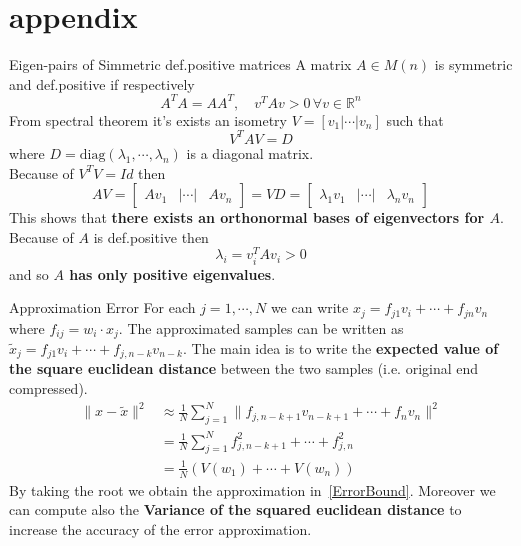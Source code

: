 \documentclass[10pt]{beamer}
\theoremstyle{definition}
\newcommand{\R}{\mathbb{R}}
\newcommand{\1}{\mathbbm{1}}
\begin{document}
\section{appendix}
\begin{frame}{Eigen-pairs of Simmetric def.positive matrices}
  A matrix $A\in M(n)$ is symmetric and def.positive if respectively 
  \begin{equation}
    A^TA=AA^T,\quad v^TAv > 0\,\forall v\in\R^n
  \end{equation}
  From spectral theorem it's exists an isometry $V=[v_1|\cdots|v_n]$ such
  that 
  \[
    V^TAV = D
  \]
  where $D=\mbox{diag}(\lambda_1,\cdots,\lambda_n)$ is a diagonal matrix.\\
  Because of $V^TV=Id$ then 
  \begin{equation}
    AV =
    \begin{bmatrix}
      Av_1&|\cdots|&Av_n
    \end{bmatrix}= VD =
    \begin{bmatrix}
      \lambda_1v_1&|\cdots|&\lambda_nv_n
    \end{bmatrix}
  \end{equation}
  This shows that {\bf there exists an orthonormal bases of eigenvectors for
  $A$}.
  Because of $A$ is def.positive then 
  \[
    \lambda_i = v_i^TAv_i >  0
  \]
  and so {\bf $A$ has only positive eigenvalues}.
\end{frame}
\begin{frame}{Approximation Error}
  For each $j=1,\cdots,N$ we can write $x_j = f_{j1}v_i+\cdots+f_{jn}v_n$
  where $f_{ij} = w_i\cdot x_j$. The approximated samples can be written as
  $\tilde x_j = f_{j1}v_i+\cdots+f_{j,n-k}v_{n-k}$. The main idea is to write
  the {\bf expected value of the square euclidean distance} between the two
  samples (i.e. original end compressed).
  \begin{equation}
    \begin{aligned}
      \|x - \tilde x\|^2&\approx \frac{1}{N} \sum_{j=1}^N
      \|f_{j,n-k+1}v_{n-k+1} + \cdots + f_nv_n\|^2 \\
      &=\frac{1}{N}\sum_{j=1}^N f_{j,n-k+1}^2+\cdots+f_{j,n}^2\\
      &=\frac{1}{N}\left(V(w_1)+\cdots+V(w_n)\right)
    \end{aligned}
  \end{equation}
  By taking the root we obtain the approximation in~\ref{ErrorBound}.
  Moreover we can compute also the {\bf Variance of the squared euclidean
  distance} to increase the accuracy of the error approximation.
\end{frame}
\end{document}
